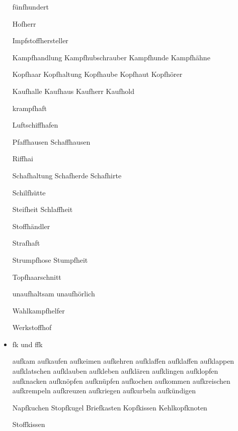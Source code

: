 \begin{itemize}
fünfhundert 

Hofherr

Impfstoffhersteller 

Kampfhandlung Kampfhubschrauber Kampfhunde Kampfhähne

Kopfhaar Kopfhaltung Kopfhaube Kopfhaut Kopfhörer

Kaufhalle Kaufhaus Kaufherr Kaufhold 

krampfhaft

Luftschiffhafen

Pfaffhausen Schaffhausen

Riffhai

Schafhaltung Schafherde Schafhirte 

Schilfhütte

Steifheit Schlaffheit 

Stoffhändler

Strafhaft

Strumpfhose Stumpfheit

Topfhaarschnitt

unaufhaltsam unaufhörlich

Wahlkampfhelfer

Werkstoffhof


\item \mbox{fk} und \mbox{ffk}

aufkam aufkaufen aufkeimen aufkehren aufklaffen aufklaffen aufklappen aufklatschen aufklauben aufkleben aufklären aufklingen aufklopfen aufknacken aufknöpfen aufknüpfen aufkochen aufkommen aufkreischen aufkrempeln aufkreuzen aufkriegen aufkurbeln aufkündigen

Napfkuchen Stopfkugel Briefkasten Kopfkissen
 Kehlkopfknoten

Stoffkissen

\end{itemize}




